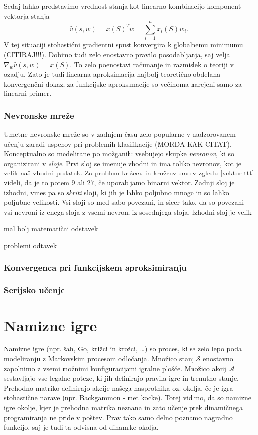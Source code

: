 \documentclass[12pt,a4paper]{amsart}
\theoremstyle{definition} %
\theoremstyle{plain} %
\newlength{\odstavek}
\begin{document}
Sedaj lahko predstavimo vrednost stanja kot linearno kombinacijo komponent vektorja stanja
$$
\hat{v}(s, w) = x(S)^T w = \sum_{i=1}^n x_i(S) w_i.
$$
V tej situaciji stohastićni gradientni spust konvergira k globalnemu minimumu (CITIRAJ!!!). Dobimo 
tudi zelo enostavno pravilo posodabljanja, saj velja $\nabla_w \hat{v}(s, w) = x(S)$. To zelo 
poenostavi računanje in razmislek o teoriji v ozadju. Zato je tudi linearna aproksimacija najbolj 
teoretično obdelana -- konvergenčni dokazi za funkcijske aproksimacije so večinoma narejeni samo 
za linearni primer.

\subsubsection{Nevronske mreže}
Umetne nevronske mreže so v zadnjem času zelo popularne v nadzorovanem učenju zaradi uspehov pri 
problemih klasifikacije (MORDA KAK CITAT). Konceptualno so modelirane po možganih: vsebujejo skupke 
\textit{nevronov}, ki so organizirani v \textit{sloje}. Prvi sloj se imenuje vhodni in ima toliko 
nevronov, kot je velik naš vhodni podatek. Za problem križcev in krožcev smo v zgledu \ref{vektor-ttt} 
videli, da je to potem $9$ ali $27$, če uporabljamo binarni vektor. Zadnji sloj je izhodni, vmes pa so 
\textit{skriti} sloji, ki jih je lahko poljubno mnogo in so lahko poljubne velikosti. Vsi sloji so med 
sabo povezani, in sicer tako, da so povezani vsi nevroni iz enega sloja z vsemi nevroni iz sosednjega 
sloja. Izhodni sloj je velik 

mal bolj matematični odstavek

problemi odtavek

\subsubsection{Konvergenca pri funkcijskem aproksimiranju}

\subsubsection{Serijsko učenje}


\section{Namizne igre}
Namizne igre (npr. šah, Go, križci in krožci, \dots) so proces, ki se zelo lepo poda modeliranju z 
Markovskim procesom odločanja. Množico stanj $\mathcal{S}$ enostavno zapolnimo z vsemi možnimi 
konfiguracijami igralne plošče. Množico akcij $\mathcal{A}$ sestavljajo vse legalne poteze, ki jih 
definirajo pravila igre in trenutno stanje. Prehodno matriko definirajo akcije našega nasprotnika oz. 
okolja, če je igra stohastične narave (npr. Backgammon - met kocke). Torej vidimo, da so namizne igre
okolje, kjer je prehodna matrika neznana in zato učenje prek dinamičnega programiranja ne pride v 
poštev. Prav tako samo delno poznamo nagradno funkcijo, saj je tudi ta odvisna od dinamike okolja.  
\end{document}

